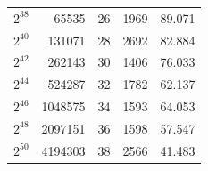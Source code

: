 \documentclass[conference,compsoc]{IEEEtran}
\begin{document}
\begin{table}[!t]
\begin{tabular}{rrrrr}
		\rowcolor[HTML]{FFFFFF} 
		$2^{38}$                                                              & 65535                                                                            & 26                           & 1969                      & 89.071                       \\
		\rowcolor[HTML]{FFFFFF} 
		$2^{40}$                                                              & 131071                                                                           & 28                           & 2692                      & 82.884                       \\
		\rowcolor[HTML]{FFFFFF} 
		$2^{42}$                                                              & 262143                                                                           & 30                           & 1406                      & 76.033                       \\
		\rowcolor[HTML]{FFFFFF} 
		$2^{44}$                                                              & 524287                                                                           & 32                           & 1782                      & 62.137                       \\
		\rowcolor[HTML]{FFFFFF} 
		$2^{46}$                                                              & 1048575                                                                          & 34                           & 1593                      & 64.053                       \\
		\rowcolor[HTML]{FFFFFF} 
		$2^{48}$                                                              & 2097151                                                                          & 36                           & 1598                      & 57.547                       \\
		\rowcolor[HTML]{FFFFFF} 
		$2^{50}$                                                              & 4194303                                                                          & 38                           & 2566                      & 41.483                       \\ \hline
	\end{tabular}
\end{table}
 
\end{document}
